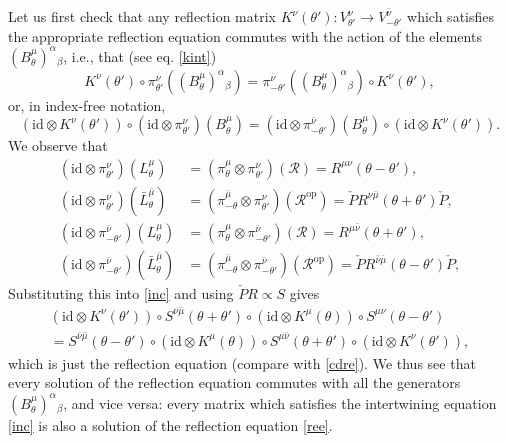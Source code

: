 \documentclass[a4paper,12pt]{article}
\newcommand{\id}{\text{id}}
\newcommand{\mub}{\bar{\mu}}
\newcommand{\nub}{\bar{\nu}}
\numberwithin{equation}{section}
\begin{document}
Let us first check that any reflection matrix
$K^\nu(\theta'):V^\nu_{\theta'}\rightarrow V^{\nub}_{-\theta'}$
which satisfies the appropriate reflection equation commutes with
the action of the elements $(B^\mu_\theta)^\alpha{}_\beta$, i.e.,
that (see eq. \eqref{kint})
\begin{equation}
  K^\nu(\theta')\circ\pi^\nu_{\theta'}((B^\mu_\theta)^\alpha{}_\beta)=
  \pi^{\bar{\nu}}_{-\theta'}((B^\mu_\theta)^\alpha{}_\beta)\circ K^\nu(\theta'),
\end{equation}
or, in index-free notation,
\begin{equation}\label{inc}
  (\id\otimes K^\nu(\theta'))\circ
  (\id\otimes \pi^\nu_{\theta'})(B^\mu_\theta)=
  (\id\otimes \pi^{\bar{\nu}}_{-\theta'})(B^\mu_\theta)\circ
  (\id\otimes K^\nu(\theta')).
\end{equation}
We observe that
\begin{align}
  (\id\otimes \pi^\nu_{\theta'})(L^\mu_\theta)&=
  (\pi^\mu_\theta\otimes\pi^\nu_{\theta'})({\mathcal R})=
  R^{\mu\nu}(\theta-\theta'),\\
%
  (\id\otimes \pi^\nu_{\theta'})(\bar{L}^{\mub}_\theta)&=
  (\pi^{\mub}_{-\theta}\otimes\pi^\nu_{\theta'})
  ({\mathcal R}^{\text{op}})=\check{P}
  R^{\nu\mub}(\theta+\theta')\check{P},\\
%
  (\id\otimes \pi^{\nub}_{-\theta'})(L^\mu_\theta)&=
  (\pi^\mu_\theta\otimes\pi^{\nub}_{-\theta'})({\mathcal R})=
  R^{\mu\nub}(\theta+\theta'),\\
%
  (\id\otimes \pi^{\nub}_{-\theta'})(\bar{L}^{\mub}_\theta)&=
  (\pi^{\mub}_{-\theta}\otimes\pi^{\nub}_{-\theta'})
  ({\mathcal R}^{\text{op}})=\check{P}
  R^{\nub\mub}(\theta-\theta')\check{P},
\end{align}
Substituting this into \eqref{inc} and using $\check{P}R\propto S$
gives
\begin{multline}\label{ree}
  (\id\otimes K^\nu(\theta'))\circ
  S^{\nu\mub}(\theta+\theta')\circ
  (\id\otimes K^\mu(\theta))\circ
  S^{\mu\nu}(\theta-\theta')\\
  =S^{\nub\mub}(\theta-\theta')\circ
  (\id\otimes K^\mu(\theta))\circ
  S^{\mu\nub}(\theta+\theta')\circ
  (\id\otimes K^\nu(\theta')),
\end{multline}
which is just the reflection equation (compare with \eqref{cdre}).
We thus see that every solution of the reflection equation
commutes with all the generators $(B^\mu_\theta)^\alpha{}_\beta$,
and vice versa: every matrix which satisfies the intertwining
equation \eqref{inc} is also a solution of the reflection equation
\eqref{ree}.
\end{document}
